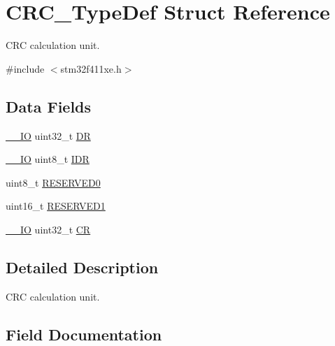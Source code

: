 \hypertarget{struct_c_r_c___type_def}{}\section{C\+R\+C\+\_\+\+Type\+Def Struct Reference}
\label{struct_c_r_c___type_def}


C\+RC calculation unit.  




{\ttfamily \#include $<$stm32f411xe.\+h$>$}

\subsection*{Data Fields}
\begin{DoxyCompactItemize}
\item 
\hyperlink{core__sc300_8h_aec43007d9998a0a0e01faede4133d6be}{\+\_\+\+\_\+\+IO} uint32\+\_\+t \hyperlink{struct_c_r_c___type_def_a50cb22870dbb9001241cec694994e5ef}{DR}
\item 
\hyperlink{core__sc300_8h_aec43007d9998a0a0e01faede4133d6be}{\+\_\+\+\_\+\+IO} uint8\+\_\+t \hyperlink{struct_c_r_c___type_def_ad84e8694cd4b5375ee533c2d875c3b5a}{I\+DR}
\item 
uint8\+\_\+t \hyperlink{struct_c_r_c___type_def_a70dfd1730dba65041550ef55a44db87c}{R\+E\+S\+E\+R\+V\+E\+D0}
\item 
uint16\+\_\+t \hyperlink{struct_c_r_c___type_def_a8b205c6e25b1808ac016db2356b3021d}{R\+E\+S\+E\+R\+V\+E\+D1}
\item 
\hyperlink{core__sc300_8h_aec43007d9998a0a0e01faede4133d6be}{\+\_\+\+\_\+\+IO} uint32\+\_\+t \hyperlink{struct_c_r_c___type_def_af33fa5c173e1c102e6d0242fe60e569f}{CR}
\end{DoxyCompactItemize}


\subsection{Detailed Description}
C\+RC calculation unit. 

\subsection{Field Documentation}
\mbox{\label{struct_c_r_c___type_def_af33fa5c173e1c102e6d0242fe60e569f}} 
